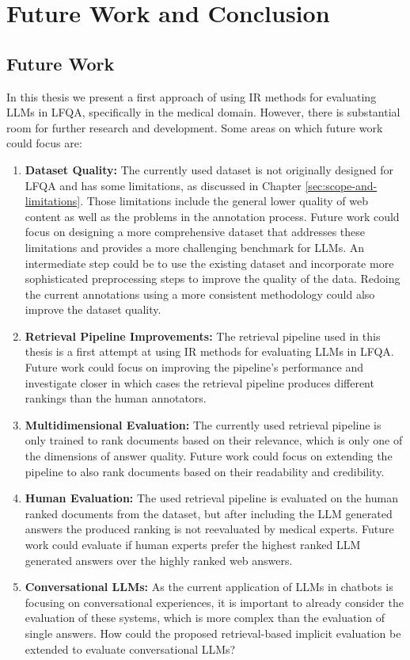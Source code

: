 \chapter{Future Work and Conclusion}\label{conclusion}

\section{Future Work}
In this thesis we present a first approach of using IR methods for evaluating LLMs in LFQA, specifically in the medical domain.
However, there is substantial room for further research and development.
Some areas on which future work could focus are:

\begin{enumerate}
    \item \textbf{Dataset Quality:} The currently used dataset is not originally designed for LFQA and has some limitations, as discussed in Chapter \ref{sec:scope-and-limitations}. Those limitations include the general lower quality of web content as well as the problems in the annotation process. Future work could focus on designing a more comprehensive dataset that addresses these limitations and provides a more challenging benchmark for LLMs. An intermediate step could be to use the existing dataset and incorporate more sophisticated preprocessing steps to improve the quality of the data. Redoing the current annotations using a more consistent methodology could also improve the dataset quality.
    \item \textbf{Retrieval Pipeline Improvements:} The retrieval pipeline used in this thesis is a first attempt at using IR methods for evaluating LLMs in LFQA. Future work could focus on improving the pipeline's performance and investigate closer in which cases the retrieval pipeline produces different rankings than the human annotators.
    \item \textbf{Multidimensional Evaluation:} The currently used retrieval pipeline is only trained to rank documents based on their relevance, which is only one of the dimensions of answer quality. Future work could focus on extending the pipeline to also rank documents based on their readability and credibility.
    \item \textbf{Human Evaluation:} The used retrieval pipeline is evaluated on the human ranked documents from the dataset, but after including the LLM generated answers the produced ranking is not reevaluated by medical experts. Future work could evaluate if human experts prefer the highest ranked LLM generated answers over the highly ranked web answers.
    \item \textbf{Conversational LLMs:} As the current application of LLMs in chatbots is focusing on conversational experiences, it is important to already consider the evaluation of these systems, which is more complex than the evaluation of single answers. How could the proposed retrieval-based implicit evaluation be extended to evaluate conversational LLMs?
\end{enumerate}

